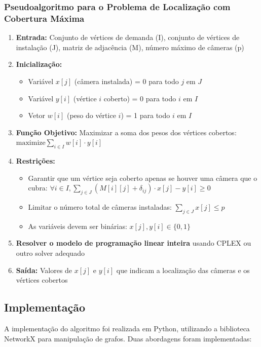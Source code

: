 \documentclass[12pt, a4paper]{report}
\begin{document}
\subsubsection{Pseudoalgoritmo para o Problema de Localização com Cobertura Máxima}
\begin{enumerate}
    \item \textbf{Entrada:} Conjunto de vértices de demanda (I), conjunto de vértices de instalação (J), matriz de adjacência (M), número máximo de câmeras (p)
    \item \textbf{Inicialização:}
    \begin{itemize}
        \item Variável \(x[j]\) (câmera instalada) = 0 para todo \(j\) em \(J\)
        \item Variável \(y[i]\) (vértice \(i\) coberto) = 0 para todo \(i\) em \(I\)
        \item Vetor \(w[i]\) (peso do vértice \(i\)) = 1 para todo \(i\) em \(I\)
    \end{itemize}
    \item \textbf{Função Objetivo:} Maximizar a soma dos pesos dos vértices cobertos: \(\text{maximize} \sum_{i \in I} w[i] \cdot y[i]\)
    \item \textbf{Restrições:}
    \begin{itemize}
        \item Garantir que um vértice seja coberto apenas se houver uma câmera que o cubra: \(\forall i \in I, \sum_{j \in J} (M[i][j] + \delta_{ij}) \cdot x[j] - y[i] \geq 0\)
        \item Limitar o número total de câmeras instaladas: \(\sum_{j \in J} x[j] \leq p\)
        \item As variáveis devem ser binárias: \(x[j], y[i] \in \{0, 1\}\)
    \end{itemize}
    \item \textbf{Resolver o modelo de programação linear inteira} usando CPLEX ou outro solver adequado
    \item \textbf{Saída:} Valores de \(x[j]\) e \(y[i]\) que indicam a localização das câmeras e os vértices cobertos
\end{enumerate}

\subsection{Implementação}
A implementação do algoritmo foi realizada em Python, utilizando a biblioteca NetworkX para manipulação de grafos. Duas abordagens foram implementadas:
\end{document}
